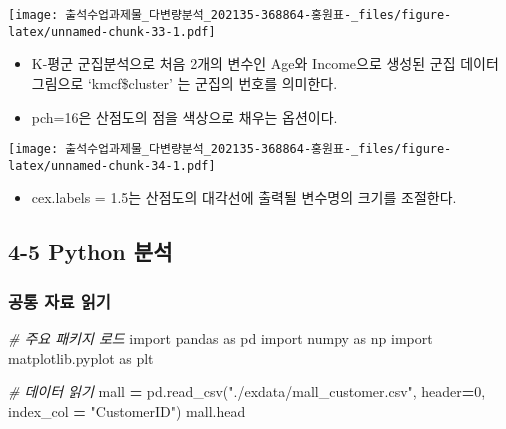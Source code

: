 \documentclass[
]{article}
\newenvironment{Shaded}{\begin{snugshade}}{\end{snugshade}}
\newcommand{\AttributeTok}[1]{\textcolor[rgb]{0.77,0.63,0.00}{#1}}
\newcommand{\CommentTok}[1]{\textcolor[rgb]{0.56,0.35,0.01}{\textit{#1}}}
\newcommand{\DecValTok}[1]{\textcolor[rgb]{0.00,0.00,0.81}{#1}}
\newcommand{\FloatTok}[1]{\textcolor[rgb]{0.00,0.00,0.81}{#1}}
\newcommand{\FunctionTok}[1]{\textcolor[rgb]{0.00,0.00,0.00}{#1}}
\newcommand{\ImportTok}[1]{#1}
\newcommand{\NormalTok}[1]{#1}
\newcommand{\OperatorTok}[1]{\textcolor[rgb]{0.81,0.36,0.00}{\textbf{#1}}}
\newcommand{\SpecialCharTok}[1]{\textcolor[rgb]{0.00,0.00,0.00}{#1}}
\newcommand{\StringTok}[1]{\textcolor[rgb]{0.31,0.60,0.02}{#1}}
\providecommand{\tightlist}{%
  \setlength{\itemsep}{0pt}\setlength{\parskip}{0pt}}
\begin{document}
\texttt{[image: 출석수업과제물\_다변량분석\_202135-368864-홍원표-\_files/figure-latex/unnamed-chunk-33-1.pdf]}

\begin{itemize}
\tightlist
\item
  K-평군 군집분석으로 처음 2개의 변수인 Age와 Income으로 생성된 군집
  데이터 그림으로 `kmcf\$cluster' 는 군집의 번호를 의미한다.
\item
  pch=16은 산점도의 점을 색상으로 채우는 옵션이다.
\end{itemize}

\begin{Shaded}
\end{Shaded}

\texttt{[image: 출석수업과제물\_다변량분석\_202135-368864-홍원표-\_files/figure-latex/unnamed-chunk-34-1.pdf]}

\begin{itemize}
\tightlist
\item
  cex.labels = 1.5는 산점도의 대각선에 출력될 변수명의 크기를 조절한다.
\end{itemize}

\hypertarget{python-uxbd84uxc11d}{%
\subsection{4-5 Python 분석}\label{python-uxbd84uxc11d}}

\hypertarget{uxacf5uxd1b5-uxc790uxb8cc-uxc77duxae30-1}{%
\subsubsection{공통 자료
읽기}\label{uxacf5uxd1b5-uxc790uxb8cc-uxc77duxae30-1}}

\begin{Shaded}
\begin{Highlighting}[]
\CommentTok{\# 주요 패키지 로드}
\ImportTok{import}\NormalTok{ pandas }\ImportTok{as}\NormalTok{ pd}
\ImportTok{import}\NormalTok{ numpy }\ImportTok{as}\NormalTok{ np}
\ImportTok{import}\NormalTok{ matplotlib.pyplot }\ImportTok{as}\NormalTok{ plt}

\CommentTok{\# 데이터 읽기}
\NormalTok{mall }\OperatorTok{=}\NormalTok{ pd.read\_csv(}\StringTok{"./exdata/mall\_customer.csv"}\NormalTok{, header}\OperatorTok{=}\DecValTok{0}\NormalTok{, index\_col }\OperatorTok{=} \StringTok{"CustomerID"}\NormalTok{)}
\NormalTok{mall.head}
\end{Highlighting}
\end{Shaded}
\end{document}
